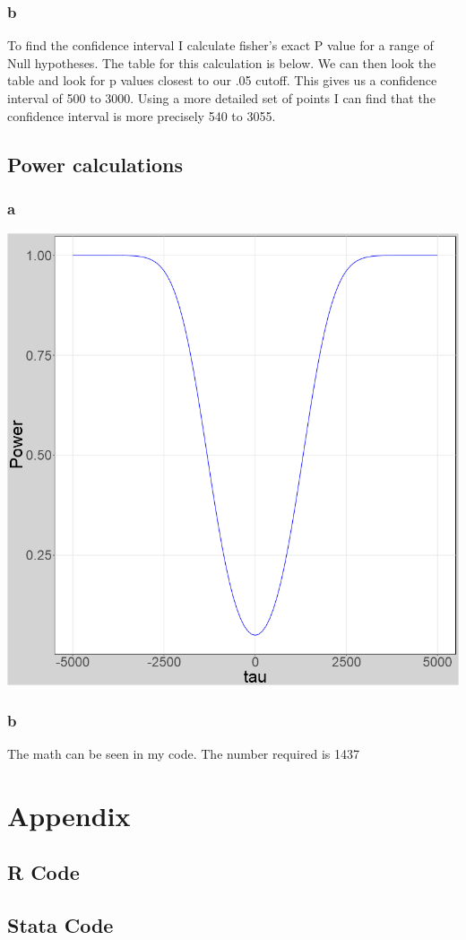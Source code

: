 \documentclass[11pt]{article}
\begin{document}
  \begin{center}
 	
 \end{center}
  \begin{center}
	
  \end{center}
 \subsubsection{b}
 To find the confidence interval I calculate fisher's exact P value for a range of Null hypotheses. The table for this calculation is below. We can then look the table and look for p values closest to our .05 cutoff. This gives us a confidence interval of 500 to 3000. Using a more detailed set of points I can find that the confidence interval is more precisely 540 to 3055.
 \begin{center}
 	
 \end{center}
 
 \subsection{Power calculations}
 \subsubsection{a}
 
\begin{minipage}{\linewidth}
	\begin{center}
		\includegraphics[width=.6\linewidth]{power_func_r.png}
	\end{center}
\end{minipage}




 \subsubsection{b}
 The math can be seen in my code. The number required is 1437
 
 \section{Appendix}
 \subsection{R Code}
 
 
 \subsection{Stata Code}
  
 
 
\end{document}
